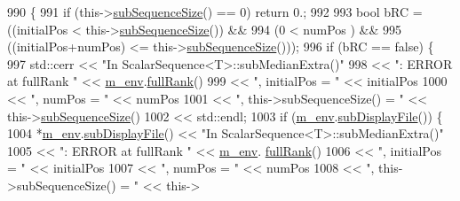 \begin{DoxyCode}
990 \{
991   \textcolor{keywordflow}{if} (this->\hyperlink{class_q_u_e_s_o_1_1_scalar_sequence_a0288ea295eedc216a1617b3286f6f3a0}{subSequenceSize}() == 0) \textcolor{keywordflow}{return} 0.;
992 
993   \textcolor{keywordtype}{bool} bRC = ((initialPos          <  this->\hyperlink{class_q_u_e_s_o_1_1_scalar_sequence_a0288ea295eedc216a1617b3286f6f3a0}{subSequenceSize}()) &&
994               (0                   <  numPos                 ) &&
995               ((initialPos+numPos) <= this->\hyperlink{class_q_u_e_s_o_1_1_scalar_sequence_a0288ea295eedc216a1617b3286f6f3a0}{subSequenceSize}()));
996   \textcolor{keywordflow}{if} (bRC == \textcolor{keyword}{false}) \{
997     std::cerr << \textcolor{stringliteral}{"In ScalarSequence<T>::subMedianExtra()"}
998               << \textcolor{stringliteral}{": ERROR at fullRank "}         << \hyperlink{class_q_u_e_s_o_1_1_scalar_sequence_a71618cd6351b29361b437af68447a4c8}{m\_env}.\hyperlink{class_q_u_e_s_o_1_1_base_environment_a84a239e42ae443cf71db6e03e8159620}{fullRank}()
999               << \textcolor{stringliteral}{", initialPos = "}              << initialPos
1000               << \textcolor{stringliteral}{", numPos = "}                  << numPos
1001               << \textcolor{stringliteral}{", this->subSequenceSize() = "} << this->\hyperlink{class_q_u_e_s_o_1_1_scalar_sequence_a0288ea295eedc216a1617b3286f6f3a0}{subSequenceSize}()
1002               << std::endl;
1003     \textcolor{keywordflow}{if} (\hyperlink{class_q_u_e_s_o_1_1_scalar_sequence_a71618cd6351b29361b437af68447a4c8}{m\_env}.\hyperlink{class_q_u_e_s_o_1_1_base_environment_a8a0064746ae8dddfece4229b9ad374d6}{subDisplayFile}()) \{
1004       *\hyperlink{class_q_u_e_s_o_1_1_scalar_sequence_a71618cd6351b29361b437af68447a4c8}{m\_env}.\hyperlink{class_q_u_e_s_o_1_1_base_environment_a8a0064746ae8dddfece4229b9ad374d6}{subDisplayFile}() << \textcolor{stringliteral}{"In ScalarSequence<T>::subMedianExtra()"}
1005                               << \textcolor{stringliteral}{": ERROR at fullRank "}         << \hyperlink{class_q_u_e_s_o_1_1_scalar_sequence_a71618cd6351b29361b437af68447a4c8}{m\_env}.
      \hyperlink{class_q_u_e_s_o_1_1_base_environment_a84a239e42ae443cf71db6e03e8159620}{fullRank}()
1006                               << \textcolor{stringliteral}{", initialPos = "}              << initialPos
1007                               << \textcolor{stringliteral}{", numPos = "}                  << numPos
1008                               << \textcolor{stringliteral}{", this->subSequenceSize() = "} << this->

\end{DoxyCode}
